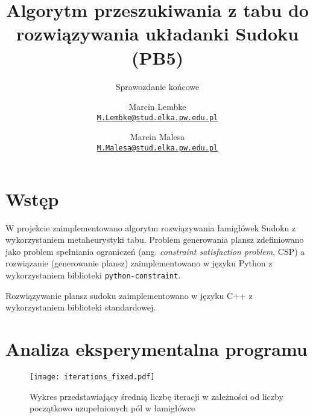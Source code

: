 \documentclass[]{project_report}
\author{%
	Marcin Lembke\\
	\texttt{\href{mailto:M.Lembke@stud.elka.pw.edu.pl}%
			{\nolinkurl{M.Lembke@stud.elka.pw.edu.pl}}}
	\and
	Marcin Malesa\\
	\texttt{\href{mailto:M.Malesa@stud.elka.pw.edu.pl}%
			{\nolinkurl{M.Malesa@stud.elka.pw.edu.pl}}}
}
\title{Algorytm przeszukiwania z tabu do rozwiązywania układanki Sudoku (PB5)}
\subtitle{Sprawozdanie końcowe}
\begin{document}
	\maketitle
	
	\section{Wstęp}
		W projekcie zaimplementowano algorytm rozwiązywania łamigłówek Sudoku z wykorzystaniem metaheurystyki tabu. Problem generowania plansz zdefiniowano jako problem spełniania ograniczeń (ang. \textit{constraint satisfaction problem}, CSP) a rozwiązanie (generowanie plansz) zaimplementowano w języku Python z wykorzystaniem biblioteki \texttt{python-constraint}.
		
		Rozwiązywanie plansz sudoku zaimplementowano w języku C++ z wykorzystaniem biblioteki standardowej.

	\section{Analiza eksperymentalna programu}
		\begin{figure}
			\centering
			\texttt{[image: iterations\_fixed.pdf]}
			\caption{Wykres przedstawiający średnią liczbę iteracji w zależności od liczby początkowo uzupełnionych pól w łamigłówce}
		\end{figure}
		
	\printbibliography
\end{document}

